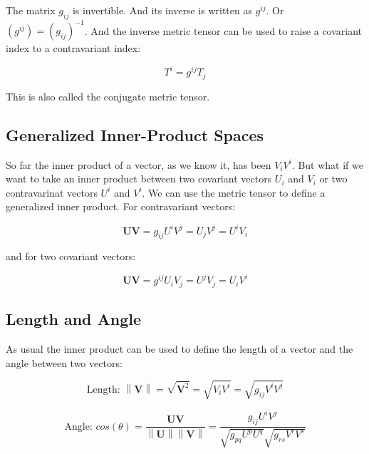\documentclass{article}
\newcommand\norm[1]{\left\lVert#1\right\rVert}
\begin{document}
The matrix $g_{ij}$ is invertible.  And its inverse is written as $g^{ij}$. Or $(g^{ij}) = (g_{ij})^{-1}$.  And the inverse metric tensor can be used to raise a covariant index to a contravariant index:

\begin{equation}
	T^i = g^{ij} T_j
\end{equation}

\noindent
This is also called the conjugate metric tensor.



\subsection{Generalized Inner-Product Spaces}

So far the inner product of a vector, as we know it, has been $V_i V^i$.  But what if we want to take an inner product between two covariant vectors $U_i$ and $V_i$ or two contravarinat vectors $U^i$ and $V^i$.
We can use the metric tensor to define a generalized inner product.  For contravariant vectors:

\begin{equation}
	\mathbf{ U } \mathbf{ V } = g_{ij} U^i V^j = U_j V^j = U^i V_i
\end{equation}

and for two covariant vectors:

\begin{equation}
	\mathbf{ U } \mathbf{ V } = g^{ij} U_i V_j = U^j V_j = U_i V^i
\end{equation}


\subsection{Length and Angle}

As usual the inner product can be used to define the length of a vector and the angle between two vectors:

\begin{equation}
	\text{Length: } \norm{ \mathbf{ V } } = \sqrt{\mathbf{V}^2} = \sqrt{V_i V^i} = \sqrt{ g_{ij} V^i V^j}
\end{equation}

\begin{equation}
	\text{Angle: } cos( \theta ) = \frac{ \mathbf{ UV } }{ \norm{ \mathbf{ U } } \norm{ \mathbf{ V } } } = \frac{ g_{ij} U^i V^j }{ \sqrt{ g_{pq} U^p U^q} \sqrt{ g_{rs} V^r V^s} }
\end{equation}
\end{document}
